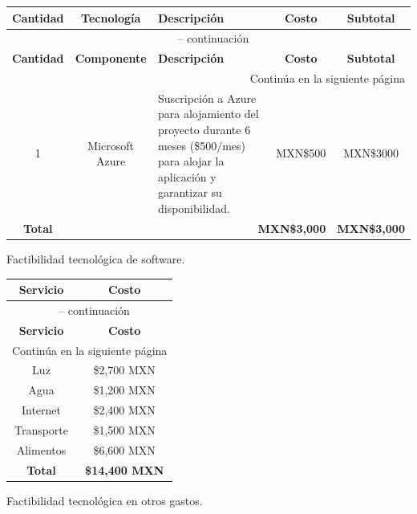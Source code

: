\begingroup
\setlength{\tabcolsep}{4pt} %
\renewcommand{\arraystretch}{1.2} %

\begin{longtable}{|c|c|>{\centering\arraybackslash}m{5cm}|c|c|}
	\hline
	\rowcolor{black!75} \color{white}\textbf{Cantidad} & \color{white}\textbf{Tecnología} & \color{white}\textbf{Descripción} & \color{white}\textbf{Costo} & \color{white}\textbf{Subtotal} \\ 
	\hline
	\endfirsthead
	
	\multicolumn{5}{c}{{\tablename\ \thetable{} -- continuación}} \\
	\hline
	\rowcolor{black!75} \color{white}\textbf{Cantidad} & \color{white}\textbf{Componente} & \color{white}\textbf{Descripción} & \color{white}\textbf{Costo} & \color{white}\textbf{Subtotal} \\ 
	\hline
	\endhead
	
	\hline \multicolumn{5}{r}{{Continúa en la siguiente página}} \\ 
	\endfoot
	
	\hline
	\endlastfoot
	
	1 & Microsoft Azure & Suscripción a Azure para alojamiento del proyecto durante 6 meses (\$500/mes) para alojar la aplicación y garantizar su disponibilidad. & MXN\$500 & MXN\$3000 \\ 
	\hline
	\textbf{Total} & \multicolumn{3}{r|}{\textbf{MXN\$3,000}} & \textbf{MXN\$3,000} \\ 
	\hline
\end{longtable}
\caption{Factibilidad tecnológica de software.}
\label{tab:factibiliad_software}
\endgroup


\begingroup
\setlength{\tabcolsep}{8pt} %
\renewcommand{\arraystretch}{1.2} %

\begin{longtable}{|c|c|}
	\hline
	\rowcolor{black!75} \color{white}\textbf{Servicio} & \color{white}\textbf{Costo} \\ 
	\hline
	\endfirsthead
	
	\multicolumn{2}{c}{{\tablename\ \thetable{} -- continuación}} \\
	\hline
	\rowcolor{black!75} \color{white}\textbf{Servicio} & \color{white}\textbf{Costo} \\ 
	\hline
	\endhead
	
	\hline \multicolumn{2}{r}{{Continúa en la siguiente página}} \\ 
	\endfoot
	
	\hline
	\endlastfoot
	
	Luz & \$2,700 MXN \\ 
	\hline
	Agua & \$1,200 MXN \\ 
	\hline
	Internet & \$2,400 MXN \\ 
	\hline
	Transporte & \$1,500 MXN \\ 
	\hline
	Alimentos & \$6,600 MXN \\ 
	\hline
	\textbf{Total} & \textbf{\$14,400 MXN} \\ 
	\hline
\end{longtable}
\caption{Factibilidad tecnológica en otros gastos.}
\label{tab:factibiliad_otros}
\endgroup

